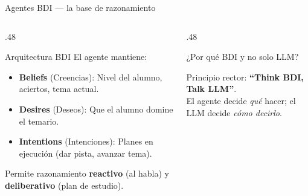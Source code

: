 \documentclass[aspectratio=169, 10pt]{beamer}
\newcommand{\concept}[1]{\textbf{\color{olibotBlue}#1}}
\begin{document}
\begin{frame}{Agentes BDI — la base de razonamiento}
  \begin{columns}[T]
    \begin{column}{.48\textwidth}
      \begin{block}{Arquitectura BDI}
        \small
        El agente mantiene:
        \begin{itemize}
          \item \concept{Beliefs} (Creencias): Nivel del alumno, aciertos, tema actual.
          \item \concept{Desires} (Deseos): Que el alumno domine el temario.
          \item \concept{Intentions} (Intenciones): Planes en ejecución (dar pista, avanzar tema).
        \end{itemize}
        \vspace{4pt}
        Permite razonamiento \textbf{reactivo} (al habla) y \textbf{deliberativo} (plan de estudio).
      \end{block}
    \end{column}
    \begin{column}{.48\textwidth}
      \begin{block}{¿Por qué BDI y no solo LLM?}
        \begin{center}
        \end{center}
        \vspace{4pt}
        \small
        Principio rector: \textbf{``Think BDI, Talk LLM''}.\\
        El agente decide \textit{qué} hacer; el LLM decide \textit{cómo decirlo}.
      \end{block}
    \end{column}
  \end{columns}
\end{frame}
\end{document}
